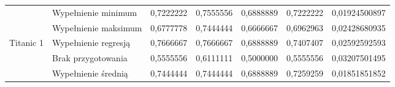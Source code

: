\documentclass{book}
\begin{document}
\begin{table}[H]
\begin{tabular}{|l|l|r|r|r|r|r|}
                                & Wypełnienie minimum  & 0,7222222                                                                        & 0,7555556                                                                                & \cellcolor[HTML]{67FD9A}0,6888889                                                                  & 0,7222222                                                                       & 0,01924500897                                                                    \\ \cline{2-7} 
                                & Wypełnienie maksimum & 0,6777778                                                                        & 0,7444444                                                                                & 0,6666667                                                                                          & 0,6962963                                                                       & 0,02428680935                                                                    \\ \cline{2-7} 
    \multirow{-5}{*}{Titanic 1} & Wypełnienie regresją & 0,7666667                                                                        & \cellcolor[HTML]{67FD9A}0,7666667                                                        & \cellcolor[HTML]{67FD9A}0,6888889                                                                  & \cellcolor[HTML]{FFCC67}0,7407407                                               & \cellcolor[HTML]{FFCC67}0,02592592593                                            \\ \hline
                                & Brak przygotowania   & 0,5555556                                                                        & 0,6111111                                                                                & 0,5000000                                                                                          & 0,5555556                                                                       & 0,03207501495                                                                    \\ \cline{2-7} 
                                & Wypełnienie średnią  & 0,7444444                                                                        & \cellcolor[HTML]{67FD9A}0,7444444                                                        & \cellcolor[HTML]{67FD9A}0,6888889                                                                  & 0,7259259                                                                       & 0,01851851852                                                                    \\ \cline{2-7} 

\end{tabular}
\end{table}
\end{document}

